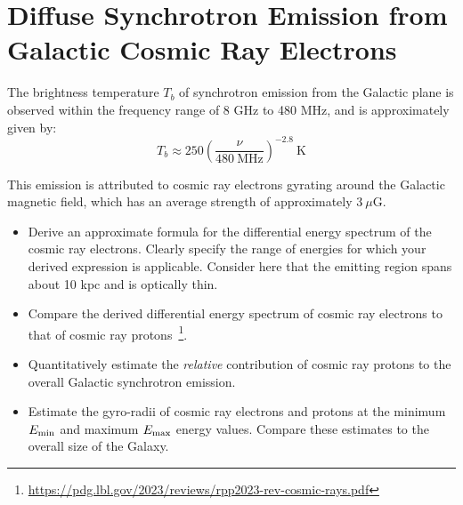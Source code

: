\section{Diffuse Synchrotron Emission from Galactic Cosmic Ray Electrons}

The brightness temperature $T_b$ of synchrotron emission from the Galactic plane is observed within the frequency range of 8 GHz to 480 MHz, and is approximately given by:
$$T_b \approx 250 \left( \frac{\nu}{480~\text{MHz}} \right)^{-2.8}~\text{K}$$

This emission is attributed to cosmic ray electrons gyrating around the Galactic magnetic field, which has an average strength of approximately $3~\mu$G. 

\begin{itemize}
\item Derive an approximate formula for the differential energy spectrum of the cosmic ray electrons. Clearly specify the range of energies for which your derived expression is applicable. Consider here that the emitting region spans about 10 kpc and is optically thin.
\item Compare the derived differential energy spectrum of cosmic ray electrons to that of cosmic ray protons~\footnote{\url{https://pdg.lbl.gov/2023/reviews/rpp2023-rev-cosmic-rays.pdf}}.
\item Quantitatively estimate the \emph{relative} contribution of cosmic ray protons to the overall Galactic synchrotron emission. 
\item Estimate the gyro-radii of cosmic ray electrons and protons at the minimum $E_{\rm min}$ and maximum $E_{\rm max}$ energy values. Compare these estimates to the overall size of the Galaxy.
\end{itemize}